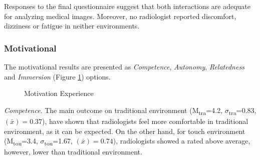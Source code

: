 \documentclass{chi-ext}
\begin{document}
Responses to the final questionnaire suggest that both interactions are adequate for analyzing medical images. Moreover, no radiologist reported discomfort, dizziness or fatigue in neither environments.

\subsubsection{Motivational}

The motivational results are presented as \textit{Competence}, \textit{Autonomy}, \textit{Relatedness} and \textit{Immersion} (Figure \ref{fig:Fig10}) options.

\begin{figure}
\caption{Motivation Experience}
\label{fig:Fig10}
\end{figure}

\textit{Competence}. The main outcome on traditional environment (M\textsubscript{tra}=4.2, $\sigma$\textsubscript{tra}=0.83, {}$\left({\bar x}\right)=0.37$), have shown that radiologists feel more comfortable in traditional environment, as it can be expected. On the other hand, for touch environment (M\textsubscript{tou}=3.4, $\sigma$\textsubscript{tou}=1.67, {}$\left({\bar x}\right)=0.74$), radiologists showed a rated above average, however, lower than traditional environment.
\end{document}
